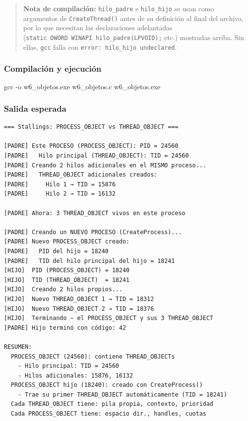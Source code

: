 \documentclass[
  spanish,
]{article}
\newenvironment{Shaded}{}{}
\newcommand{\AttributeTok}[1]{\textcolor[rgb]{0.49,0.56,0.16}{#1}}
\newcommand{\NormalTok}[1]{#1}
\begin{document}
\begin{quote}
\textbf{Nota de compilación:} \texttt{hilo\_padre} e \texttt{hilo\_hijo}
se usan como argumentos de \texttt{CreateThread()} antes de su
definición al final del archivo, por lo que necesitan las declaraciones
adelantadas (\texttt{static\ DWORD\ WINAPI\ hilo\_padre(LPVOID);} etc.)
mostradas arriba. Sin ellas, \texttt{gcc} falla con
\texttt{error:\ \textquotesingle{}hilo\_hijo\textquotesingle{}\ undeclared}.
\end{quote}

\subsubsection{Compilación y
ejecución}\label{compilaciuxf3n-y-ejecuciuxf3n-5}

\begin{Shaded}
\begin{Highlighting}[]
\NormalTok{gcc }\AttributeTok{{-}o}\NormalTok{ w6\_objetos.exe w6\_objetos.c}
\NormalTok{w6\_objetos.exe}
\end{Highlighting}
\end{Shaded}

\subsubsection{Salida esperada}\label{salida-esperada-5}

\begin{verbatim}
=== Stallings: PROCESS_OBJECT vs THREAD_OBJECT ===

[PADRE] Este PROCESO (PROCESS_OBJECT): PID = 24560
[PADRE]   Hilo principal (THREAD_OBJECT): TID = 24560
[PADRE] Creando 2 hilos adicionales en el MISMO proceso...
[PADRE]   THREAD_OBJECT adicionales creados:
[PADRE]     Hilo 1 → TID = 15876
[PADRE]     Hilo 2 → TID = 16132

[PADRE] Ahora: 3 THREAD_OBJECT vivos en este proceso

[PADRE] Creando un NUEVO PROCESO (CreateProcess)...
[PADRE] Nuevo PROCESS_OBJECT creado:
[PADRE]   PID del hijo = 18240
[PADRE]   TID del hilo principal del hijo = 18241
[HIJO]  PID (PROCESS_OBJECT) = 18240
[HIJO]  TID (THREAD_OBJECT)  = 18241
[HIJO]  Creando 2 hilos propios...
[HIJO]  Nuevo THREAD_OBJECT 1 → TID = 18312
[HIJO]  Nuevo THREAD_OBJECT 2 → TID = 18376
[HIJO]  Terminando — el PROCESS_OBJECT y sus 3 THREAD_OBJECT
[PADRE] Hijo terminó con código: 42

RESUMEN:
  PROCESS_OBJECT (24560): contiene THREAD_OBJECTs
    - Hilo principal: TID = 24560
    - Hilos adicionales: 15876, 16132
  PROCESS_OBJECT hijo (18240): creado con CreateProcess()
    - Trae su primer THREAD_OBJECT automáticamente (TID = 18241)
  Cada THREAD_OBJECT tiene: pila propia, contexto, prioridad
  Cada PROCESS_OBJECT tiene: espacio dir., handles, cuotas
\end{verbatim}
\end{document}
